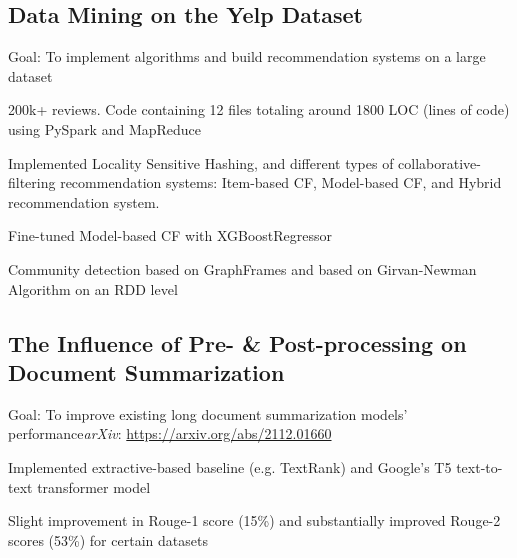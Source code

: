 \documentclass[11pt]{article}
\begin{document}
\vspace{0.1in}

\subsection*{Data Mining on the Yelp Dataset \hfill {}}
\noindent
Goal: To implement algorithms and build recommendation systems on a large dataset
\begin{compactitem}
	\item 200k+ reviews. Code containing 12 files totaling around 1800 LOC (lines of code) using PySpark and MapReduce
	\item Implemented Locality Sensitive Hashing, and different types of collaborative-filtering recommendation systems: Item-based CF, Model-based CF, and Hybrid recommendation system. 
    \item Fine-tuned Model-based CF with XGBoostRegressor
	\item Community detection based on GraphFrames and based on Girvan-Newman Algorithm on an RDD level
\end{compactitem}

\subsection*{The Influence of Pre- \& Post-processing on Document Summarization \hfill {}}
\noindent
Goal: To improve existing long document summarization models' performance\hfill\textit{arXiv}: \href{https://arxiv.org/abs/2112.01660}{https://arxiv.org/abs/2112.01660}
\begin{compactitem}
    \item Implemented extractive-based baseline (e.g. TextRank) and Google's T5 text-to-text transformer model
    \item Slight improvement in Rouge-1 score (15\%) and substantially improved Rouge-2 scores (53\%) for certain datasets
\end{compactitem}
\end{document}
